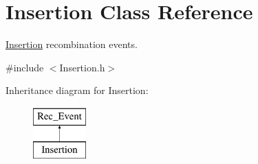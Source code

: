 \hypertarget{classInsertion}{}\section{Insertion Class Reference}
\label{classInsertion}


\hyperlink{classInsertion}{Insertion} recombination events.  




{\ttfamily \#include $<$Insertion.\+h$>$}

Inheritance diagram for Insertion\+:\begin{figure}[H]
\begin{center}
\leavevmode
\includegraphics[height=2.000000cm]{d1/d70/classInsertion}
\end{center}
\end{figure}
